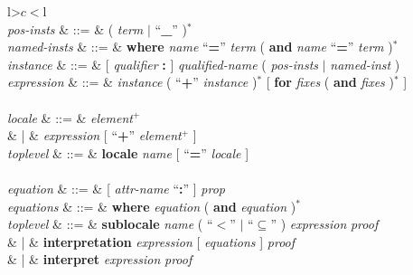 \begin{isabellebody}
\begin{isamarkuptext}
\begin{table}
\begin{center}
\begin{tabular}{l>$c<$l}
   \\

  \textit{pos-insts} & ::=
  & ( \textit{term} $|$ ``\textbf{\_}'' )$^*$ \\
  \textit{named-insts} & ::=
  & \textbf{where} \textit{name} ``\textbf{=}'' \textit{term}
  ( \textbf{and} \textit{name} ``\textbf{=}'' \textit{term} )$^*$ \\
  \textit{instance} & ::=
  & [ \textit{qualifier} \textbf{:} ]
    \textit{qualified-name} ( \textit{pos-insts} $|$ \textit{named-inst} ) \\
  \textit{expression}  & ::= 
  & \textit{instance} ( ``\textbf{+}'' \textit{instance} )$^*$
    [ \textbf{for} \textit{fixes} ( \textbf{and} \textit{fixes} )$^*$ ] \\[2ex]

   \\

  \textit{locale} & ::=
  & \textit{element}$^+$ \\
  & | & \textit{expression} [ ``\textbf{+}'' \textit{element}$^+$ ] \\
  \textit{toplevel} & ::=
  & \textbf{locale} \textit{name} [ ``\textbf{=}''
    \textit{locale} ] \\[2ex]

   \\

  \textit{equation} & ::= & [ \textit{attr-name} ``\textbf{:}'' ]
    \textit{prop} \\
  \textit{equations} & ::= &  \textbf{where} \textit{equation} ( \textbf{and}
    \textit{equation} )$^*$  \\
  \textit{toplevel} & ::=
  & \textbf{sublocale} \textit{name} ( ``$<$'' $|$
    ``$\subseteq$'' ) \textit{expression} \textit{proof} \\
  & |
  & \textbf{interpretation}
    \textit{expression} [ \textit{equations} ] \textit{proof} \\
  & |
  & \textbf{interpret}
    \textit{expression} \textit{proof} \\[2ex]

   \\


\end{tabular}
\end{center}
\end{table}
\end{isamarkuptext}
\end{isabellebody}
